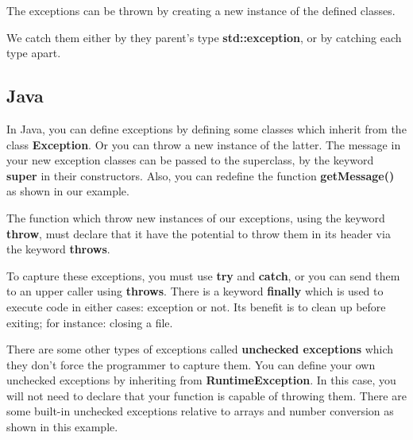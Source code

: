 \documentclass{KodeBook}
\begin{document}


The exceptions can be thrown by creating a new instance of the defined classes. 



We catch them either by they parent's type \textbf{std::exception}, or by catching each type apart. 




\subsection{Java}

In Java, you can define exceptions by defining some classes which inherit from the class \textbf{Exception}. 
Or you can throw a new instance of the latter. 
The message in your new exception classes can be passed to the superclass, by the keyword \textbf{super} in their constructors. 
Also, you can redefine the function \textbf{getMessage()} as shown in our example.



The function which throw new instances of our exceptions, using the keyword \textbf{throw}, must declare that it have the potential to throw them in its header via the keyword \textbf{throws}. 



To capture these exceptions, you must use \textbf{try} and \textbf{catch}, or you can send them to an upper caller using \textbf{throws}. 
There is a keyword \textbf{finally} which is used to execute code in either cases: exception or not. 
Its benefit is to clean up before exiting; for instance: closing a file.



There are some other types of exceptions called \textbf{unchecked exceptions} which they don't force the programmer to capture them. 
You can define your own unchecked exceptions by inheriting from \textbf{RuntimeException}. 
In this case, you will not need to declare that your function is capable of throwing them. 
There are some built-in unchecked exceptions relative to arrays and number conversion as shown in this example.
\end{document}
